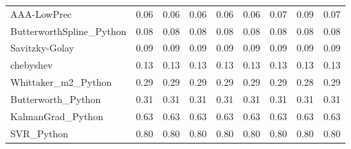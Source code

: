 \begin{table}
\begin{tabular}{lllllllll}
AAA-LowPrec & 0.06 & 0.06 & 0.06 & 0.06 & 0.06 & 0.07 & 0.09 & 0.07 \\
ButterworthSpline_Python & 0.08 & 0.08 & 0.08 & 0.08 & 0.08 & 0.08 & 0.08 & 0.08 \\
Savitzky-Golay & 0.09 & 0.09 & 0.09 & 0.09 & 0.09 & 0.09 & 0.09 & 0.09 \\
chebyshev & 0.13 & 0.13 & 0.13 & 0.13 & 0.13 & 0.13 & 0.13 & 0.13 \\
Whittaker_m2_Python & 0.29 & 0.29 & 0.29 & 0.29 & 0.29 & 0.29 & 0.28 & 0.29 \\
Butterworth_Python & 0.31 & 0.31 & 0.31 & 0.31 & 0.31 & 0.31 & 0.31 & 0.31 \\
KalmanGrad_Python & 0.63 & 0.63 & 0.63 & 0.63 & 0.63 & 0.63 & 0.63 & 0.63 \\
SVR_Python & 0.80 & 0.80 & 0.80 & 0.80 & 0.80 & 0.80 & 0.80 & 0.80 \\
\bottomrule
\end{tabular}
\end{table}
